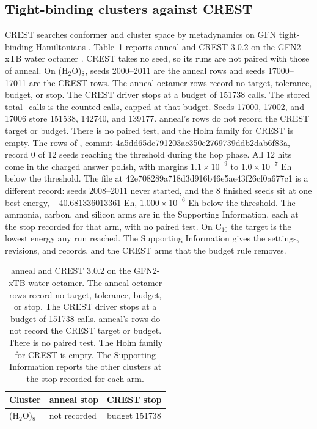 \documentclass[journal=jctcce,manuscript=article]{achemso}
\begin{document}
\subsection{Tight-binding clusters against CREST}
\label{sec:crest}
CREST searches conformer and cluster space by metadynamics on GFN
tight-binding Hamiltonians \cite{prachtCrestProgramExploration2024}.
Table~\ref{tab:crest} reports anneal and CREST 3.0.2 on the GFN2-xTB
water octamer
\cite{bannwarthGfn2xtbanAccurateBroadly2019}.
CREST takes no seed, so its runs are not paired with those of anneal.
On (H\(_2\)O)\(_8\), seeds 2000--2011 are the anneal rows and seeds 17000--17011
are the CREST rows.
The anneal octamer rows record no target, tolerance, budget, or stop.
The CREST driver stops at a budget of 151738 calls.
The stored total\_calls is the counted calls, capped at that budget.
Seeds 17000, 17002, and 17006 store 151538, 142740, and 139177.
anneal's rows do not record the CREST target or budget.
There is no paired test, and the Holm family for CREST is empty.
The rows of , commit 4a5dd65dc791203ac350e2769739ddb2dab6f83a, record 0 of 12 seeds reaching
the threshold during the hop phase.
All 12 hits come in the charged answer polish, with margins
\(1.1\times 10^{-9}\) to \(1.0\times 10^{-7}\) Eh below the threshold.
The file  at 42e708289a718d3d916b46e5ae43f26cf0a677c1 is a different record:
seeds 2008--2011 never started, and the 8 finished seeds sit at one best energy,
\(-40.681336013361\) Eh, \(1.000\times 10^{-6}\) Eh below the threshold.
The ammonia, carbon, and silicon arms are in the Supporting Information,
each at the stop recorded for that arm, with no paired test.
On C\(_{10}\) the target is the lowest energy any run reached.
The Supporting Information gives the settings, revisions, and records, and
the CREST arms that the budget rule removes.

\begin{table}
\caption{anneal and CREST 3.0.2 on the GFN2-xTB water octamer.
The anneal octamer rows record no target, tolerance, budget, or stop.
The CREST driver stops at a budget of 151738 calls.
anneal's rows do not record the CREST target or budget.
There is no paired test.
The Holm family for CREST is empty.
The Supporting Information reports the other clusters at the stop recorded for each arm.}
\label{tab:crest}
\centering
\footnotesize
\begin{tabular}{@{}lll@{}}
\toprule
Cluster & anneal stop & CREST stop \\
\midrule
(H\(_2\)O)\(_8\) & not recorded & budget 151738 \\
\bottomrule
\end{tabular}
\end{table}
\end{document}
